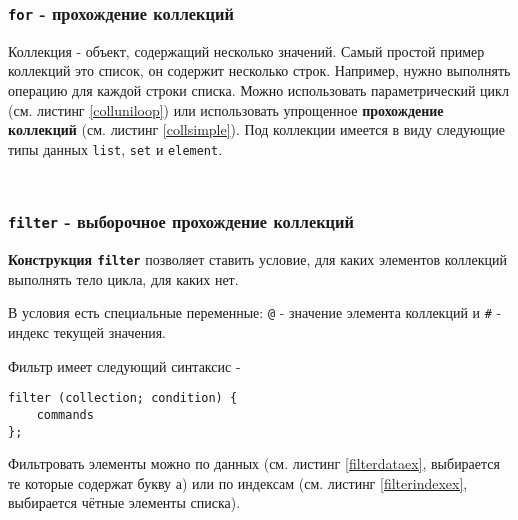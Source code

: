 \begin{sourcecode}
	\label{dowhileex}
    \inputminted[linenos]{icl}{../sources/dowhileex.icL}
\end{sourcecode}

\subsubsection{\texttt{for} - прохождение коллекций}

{Коллекция} - объект, содержащий несколько значений. Самый простой пример коллекций это список, он содержит несколько строк. Например, нужно выполнять операцию для каждой строки списка. Можно использовать параметрический цикл (см. листинг \ref{colluniloop}) или использовать упрощенное {\bf прохождение коллекций} (см. листинг \ref{collsimple}). Под коллекции имеется в виду следующие типы данных \texttt{list}, \texttt{set} и \texttt{element}.
\begin{sourcecode}
	\label{colluniloop}
    \inputminted[linenos]{icl}{../sources/colluniloop.icL}
\end{sourcecode}

\begin{sourcecode}
	\label{collsimple}
    \inputminted[linenos]{icl}{../sources/collsimple.icL}
\end{sourcecode}

\subsubsection{\texttt{filter} - выборочное прохождение коллекций}

{\bf Конструкция \texttt{filter}} позволяет ставить условие, для каких элементов коллекций выполнять тело цикла, для каких нет.

В условия есть специальные переменные: \texttt{@} - значение элемента коллекций и \texttt{#} - индекс текущей значения.

Фильтр имеет следующий синтаксис -
\begin{verbatim}
filter (collection; condition) {
	commands
};
\end{verbatim}

Фильтровать элементы можно по данных (см. листинг \ref{filterdataex}, выбирается те которые содержат букву а) или по индексам (см. листинг \ref{filterindexex}, выбирается чётные элементы списка).

